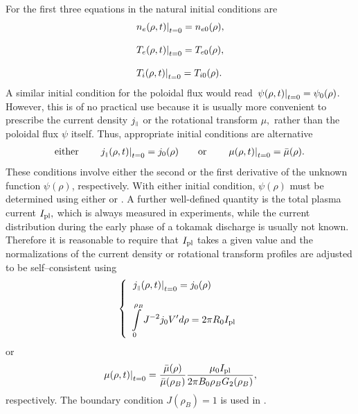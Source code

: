 For the first three equations in  the natural initial
conditions are 
\begin{equation}\label{ic}
\begin{array}{l}
\lb.n_e(\rho,t)\rb|_{t=0}=n_{e0}(\rho)
,\bigskip\\
\lb.T_e(\rho,t)\rb|_{t=0}=T_{e0}(\rho)
,\bigskip\\
\lb.T_i(\rho,t)\rb|_{t=0}=T_{i0}(\rho)
.\end{array}
\end{equation}
A similar initial condition for the poloidal flux would read
$\left.\psi(\rho,t)\right|_{t=0}=\psi_0(\rho)$. 
However, this is of no practical use because it is usually more
convenient to prescribe the current density $j_{\scriptscriptstyle\parallel}$ or the rotational
transform $\mu,$ rather than the poloidal flux $\psi$ itself. 
Thus, appropriate initial conditions are alternative 
\begin{equation}\label{icj0}
\begin{array}{l}
{\rm either}\qquad
\left.j_{\scriptscriptstyle\parallel}(\rho,t)\right|_{t=0}=j_0(\rho)
\qquad\mbox{or}\qquad
\left.\mu(\rho,t)\right|_{t=0}=\bar\mu(\rho)
.\end{array}
\end{equation}
These conditions involve either the second or the first derivative of
the unknown function $\psi(\rho)$, respectively. 
With either initial condition, $\psi(\rho)$ must be determined using
either  or .
A further well-defined quantity is the total plasma current $I_{\rm pl},$
which is always measured in experiments, while the current distribution
during the early phase of a tokamak discharge is usually not known.
Therefore it is reasonable to require that $I_{\rm pl}$ takes a given
value and the normalizations of the current density or rotational
transform profiles are adjusted to be self--consistent using
\begin{equation}\label{icj}
\lb\{\begin{array}{l}\dstyle
\lb.j_\pll(\rho,t)\rb|_{t=0}=j_0(\rho)
\bigskip\\ \dstyle
\int\limits_0^{\rho_B}J^{-2}j_0 V'd\rho=2\pi R_0 I_{\rm pl}
\end{array}\rb.
\end{equation}
or
\begin{equation}\label{icmu}
\left.\mu(\rho,t)\right|_{t=0}=\frac{\bar\mu(\rho)}{\bar\mu(\rho_B)}
\frac{\mu_0 I_{\rm pl}}{2\pi B_0 \rho_B G_2(\rho_B)}
,\end{equation}
respectively.
The boundary condition $J(\rho_B)=1$ is used in .

